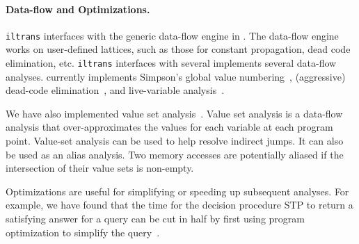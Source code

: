 \paragraph{Data-flow and Optimizations.} {\tt iltrans} interfaces with
the generic data-flow engine in \bap.  The data-flow engine works on
user-defined lattices, such as those for constant propagation, dead
code elimination, etc.  {\tt iltrans} interfaces with several
implements several data-flow analyses. \bap currently implements
Simpson's global value numbering~\cite{simpson:1996}, (aggressive)
dead-code elimination~\cite{muchnick:1997}, and live-variable
analysis~\cite{muchnick:1997}.

We have also implemented value set
analysis~\cite{balakrishnan:2007}. Value set analysis is a data-flow
analysis that over-approximates the values for each variable at each
program point. Value-set analysis can be used to help resolve indirect
jumps. It can also be used as an alias analysis.  Two memory accesses
are potentially aliased if the intersection of their value sets is
non-empty.


Optimizations are useful for simplifying or speeding up subsequent
analyses. For example, we have found that the time for the decision
procedure STP to return a satisfying answer for a query can be cut in
half by first using program optimization to simplify the
query~\cite{brumley:2008}.






